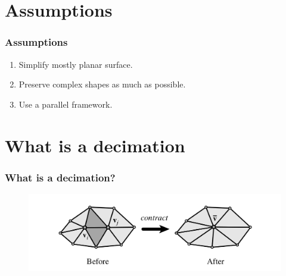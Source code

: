\documentclass[
	10pt,
	t		%
]{beamer}
\begin{document}
\section{Assumptions}
\begin{frame}
\frametitle{Assumptions}
\begin{enumerate}
\centering
\item Simplify mostly planar surface.
\item Preserve complex shapes as much as possible.
\item Use a parallel framework.
\end{enumerate}
\end{frame}

\section{What is a decimation}
\begin{frame}
\frametitle{What is a decimation?}
\begin{figure}[ht]
\centering
\includegraphics[width=1\textwidth]{edge_contraction}
\end{figure}
\end{frame}
\end{document}
